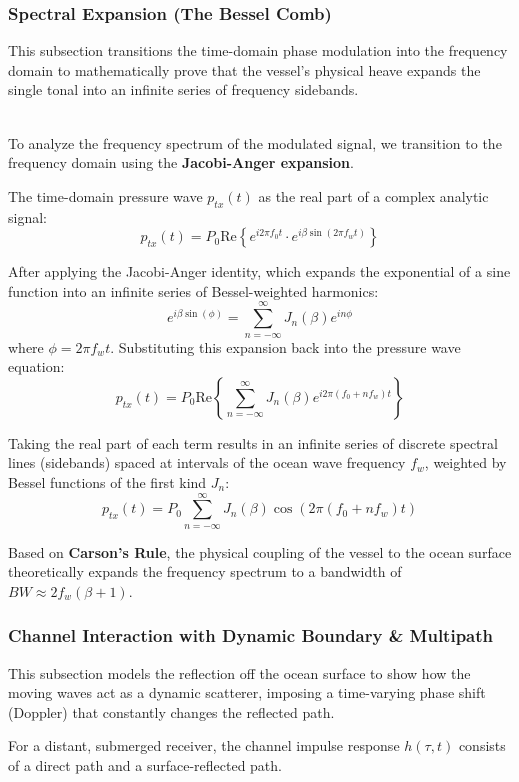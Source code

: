 \documentclass{article}
\begin{document}
\subsubsection*{Spectral Expansion (The Bessel Comb)}
This subsection transitions the time-domain phase modulation into the frequency domain to mathematically prove that the vessel's physical heave expands the single tonal into an infinite series of frequency sidebands.

\cite{carlson2001} \\
To analyze the frequency spectrum of the modulated signal, we transition to the frequency domain using the \textbf{Jacobi-Anger expansion}. 

The time-domain pressure wave $p_{tx}(t)$ as the real part of a complex analytic signal:
\[ p_{tx}(t) = P_0 \text{Re} \left\{ e^{i 2\pi f_0 t} \cdot e^{i \beta \sin(2\pi f_w t)} \right\} \]

After applying the Jacobi-Anger identity, which expands the exponential of a sine function into an infinite series of Bessel-weighted harmonics:
\[ e^{i \beta \sin(\phi)} = \sum_{n=-\infty}^{\infty} J_n(\beta) e^{i n \phi} \]
where $\phi = 2\pi f_w t$. Substituting this expansion back into the pressure wave equation:
\[ p_{tx}(t) = P_0 \text{Re} \left\{ \sum_{n=-\infty}^{\infty} J_n(\beta) e^{i 2\pi (f_0 + n f_w) t} \right\} \]

Taking the real part of each term results in an infinite series of discrete spectral lines (sidebands) spaced at intervals of the ocean wave frequency $f_w$, weighted by Bessel functions of the first kind $J_n$:
\begin{equation}
p_{tx}(t) = P_0 \sum_{n=-\infty}^{\infty} J_n(\beta) \cos\left( 2\pi (f_0 + n f_w) t \right)
\end{equation}

Based on \textbf{Carson's Rule}, the physical coupling of the vessel to the ocean surface theoretically expands the frequency spectrum to a bandwidth of $BW \approx 2 f_w (\beta + 1)$.

\subsubsection{Channel Interaction with Dynamic Boundary \& Multipath}
This subsection models the reflection off the ocean surface to show how the moving waves act as a dynamic scatterer, imposing a time-varying phase shift (Doppler) that constantly changes the reflected path.

For a distant, submerged receiver, the channel impulse response $h(\tau, t)$ consists of a direct path and a surface-reflected path.
\end{document}
